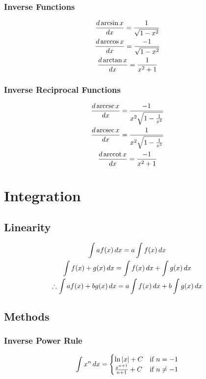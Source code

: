 \documentclass[12pt]{article}
\begin{document}
			\subsubsection{Inverse Functions}
				\begin{gather}
					\frac{d \arcsin x}{d x} = \frac{1}{\sqrt{1 -
					x^2}} \\
					\frac{d \arccos x}{d x} = \frac{-1}{\sqrt{1 -
					x^2}}  \\
					\frac{d \arctan x}{d x} = \frac{1}{x^2 + 1}
				\end{gather}
			\subsubsection{Inverse Reciprocal Functions}
				\newcommand{\arccsc}[0]{\,\text{arccsc}\,}
				\newcommand{\arcsec}[0]{\,\text{arcsec}\,}
				\newcommand{\arccot}[0]{\,\text{arccot}\,}
				\begin{gather}
					\deriv{\arccsc x} = \frac{-1}{x^2\sqrt{1
					- \frac{1}{x^2}}} \\
					\deriv{\arcsec x} = \frac{1}{x^2\sqrt{1
					- \frac{1}{x^2}}} \\
					\deriv{\arccot x} = \frac{-1}{x^2 + 1}
				\end{gather}
	\section{Integration}
		\subsection{Linearity}
			\begin{gather}
				\int af(x)\,dx = a\int f(x)\,dx \\
				\int f(x) + g(x)\,dx = \int f(x)\,dx +
				\int g(x)\,dx \\
				\therefore \int af(x) + bg(x)\,dx = a\int f(x)\,dx
				+ b\int g(x)\,dx
			\end{gather}
		\subsection{Methods}
			\subsubsection{Inverse Power Rule}
				\begin{gather}
					\int x^n\,dx =
						\begin{cases}
							\ln |x| + C & \text{if }
							n = -1 \\
							\frac{x^{n+1}}{n+1} + C
							& \text{if } n \neq -1
						\end{cases}
				\end{gather}
\end{document}
